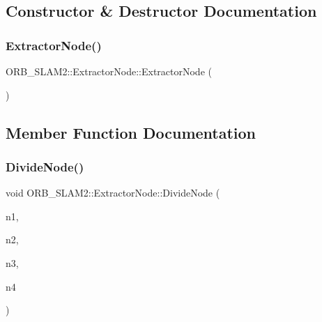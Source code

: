 \subsection{Constructor \& Destructor Documentation}
\mbox{\label{class_o_r_b___s_l_a_m2_1_1_extractor_node_af1920a7d5f8166debdd4a7fe4a15a8e9}} 
\subsubsection{\texorpdfstring{Extractor\+Node()}{ExtractorNode()}}
{\footnotesize\ttfamily O\+R\+B\+\_\+\+S\+L\+A\+M2\+::\+Extractor\+Node\+::\+Extractor\+Node (\begin{DoxyParamCaption}{ }\end{DoxyParamCaption})\hspace{0.3cm}{\ttfamily [inline]}}



\subsection{Member Function Documentation}
\mbox{\label{class_o_r_b___s_l_a_m2_1_1_extractor_node_ad560af26a7bab99551eab2e5c08f6535}} 
\subsubsection{\texorpdfstring{Divide\+Node()}{DivideNode()}}
{\footnotesize\ttfamily void O\+R\+B\+\_\+\+S\+L\+A\+M2\+::\+Extractor\+Node\+::\+Divide\+Node (\begin{DoxyParamCaption}\item[{\mbox{\hyperlink{class_o_r_b___s_l_a_m2_1_1_extractor_node}{Extractor\+Node}} \&}]{n1,  }\item[{\mbox{\hyperlink{class_o_r_b___s_l_a_m2_1_1_extractor_node}{Extractor\+Node}} \&}]{n2,  }\item[{\mbox{\hyperlink{class_o_r_b___s_l_a_m2_1_1_extractor_node}{Extractor\+Node}} \&}]{n3,  }\item[{\mbox{\hyperlink{class_o_r_b___s_l_a_m2_1_1_extractor_node}{Extractor\+Node}} \&}]{n4 }\end{DoxyParamCaption})}



